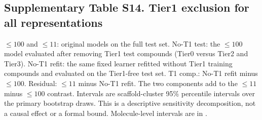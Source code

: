 \subsection*{Supplementary Table S14. Tier1 exclusion for all representations}

$\leq100$ and $\leq11$: original models on the full test set. No-T1 test: the $\leq100$ model evaluated after removing Tier1 test compounds (Tier0 versus Tier2 and Tier3). No-T1 refit: the same fixed learner refitted without Tier1 training compounds and evaluated on the Tier1-free test set. T1 comp.: No-T1 refit minus $\leq100$. Residual: $\leq11$ minus No-T1 refit. The two components add to the $\leq11$ minus $\leq100$ contrast. Intervals are scaffold-cluster 95\% percentile intervals over the primary bootstrap draws. This is a descriptive sensitivity decomposition, not a causal effect or a formal bound. Molecule-level intervals are in .

\begingroup\footnotesize\setlength{\tabcolsep}{3pt}

